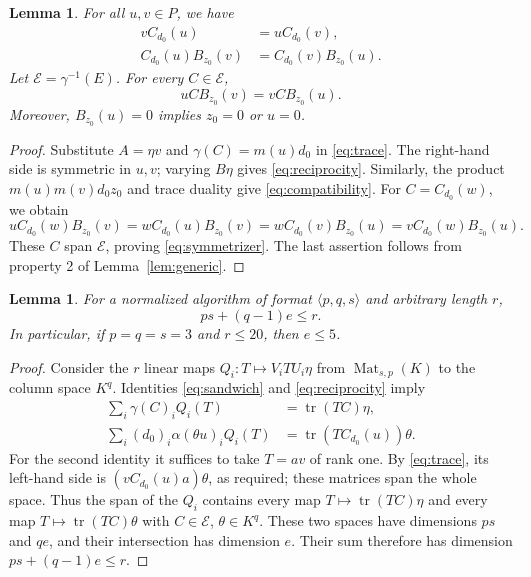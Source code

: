 \documentclass[11pt,a4paper]{article}
\numberwithin{equation}{section}
\theoremstyle{plain}
\newtheorem{lemma}[theorem]{Lemma}
\theoremstyle{definition}
\DeclareMathOperator{\tr}{tr}\DeclareMathOperator{\rk}{rk}
\DeclareMathOperator{\Mat}{Mat}\DeclareMathOperator{\Span}{span}
\newcommand{\E}{\mathcal E}\newcommand{\Sig}{\Sigma}
\newcommand{\leqs}{\leqslant}\newcommand{\geqs}{\geqslant}
\begin{document}
\begin{lemma}\label{lem:reciprocity}
For all $u,v\in P$, we have
\begin{align}
 vC_{d_0}(u)&=uC_{d_0}(v),\label{eq:reciprocity}\\
 C_{d_0}(u)B_{z_0}(v)&=C_{d_0}(v)B_{z_0}(u).\label{eq:compatibility}
\end{align}
Let $\E=\gamma^{-1}(E)$. For every $C\in\E$,
\begin{equation}\label{eq:symmetrizer}
 uCB_{z_0}(v)=vCB_{z_0}(u).
\end{equation}
Moreover, $B_{z_0}(u)=0$ implies $z_0=0$ or $u=0$.
\end{lemma}
\begin{proof}
Substitute $A=\eta v$ and $\gamma(C)=m(u)d_0$ in \eqref{eq:trace}.
The right-hand side is symmetric in $u,v$; varying $B\eta$ gives
\eqref{eq:reciprocity}. Similarly, the product $m(u)m(v)d_0z_0$
and trace duality give \eqref{eq:compatibility}.
For $C=C_{d_0}(w)$, we obtain
\[
 uC_{d_0}(w)B_{z_0}(v)
 =wC_{d_0}(u)B_{z_0}(v)
 =wC_{d_0}(v)B_{z_0}(u)
 =vC_{d_0}(w)B_{z_0}(u).
\]
These $C$ span $\E$, proving \eqref{eq:symmetrizer}.
The last assertion follows from property 2 of Lemma~\ref{lem:generic}.
\end{proof}

\begin{lemma}\label{lem:physical-bound}
For a normalized algorithm of format $\langle p,q,s\rangle$ and
arbitrary length $r$,
\[
 ps+(q-1)e\leqs r.
\]
In particular, if $p=q=s=3$ and $r\leqs20$, then $e\leqs5$.
\end{lemma}
\begin{proof}
Consider the $r$ linear maps $Q_i:T\mapsto V_iTU_i\eta$ from
$\Mat_{s,p}(K)$ to the column space $K^q$.
Identities \eqref{eq:sandwich} and \eqref{eq:reciprocity} imply
\begin{align*}
 \sum_i\gamma(C)_iQ_i(T)&=\tr(TC)\eta,\\
 \sum_i(d_0)_i\alpha(\theta u)_iQ_i(T)
       &=\tr(TC_{d_0}(u))\theta.
\end{align*}
For the second identity it suffices to take $T=av$ of rank one.
By \eqref{eq:trace}, its left-hand side is
$(vC_{d_0}(u)a)\theta$, as required; these matrices span the whole space.
Thus the span of the $Q_i$ contains every map $T\mapsto\tr(TC)\eta$
and every map $T\mapsto\tr(TC)\theta$ with $C\in\E$, $\theta\in K^q$.
These two spaces have dimensions $ps$ and $qe$, and their intersection
has dimension $e$. Their sum therefore has dimension
$ps+(q-1)e\leqs r$.
\end{proof}
\end{document}
